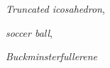 \documentclass{beamer}
\begin{document}
{\begin{itemize}
\begin{center}
\begin{minipage}{4.5cm}
\par
\end{minipage}
\begin{minipage}{4.5cm}
\centering
{\em Truncated icosahedron},\par
{\em soccer ball},\par
{\em Buckminsterfullerene}
\end{minipage}


\end{center}
\end{itemize}
}
\end{document}
